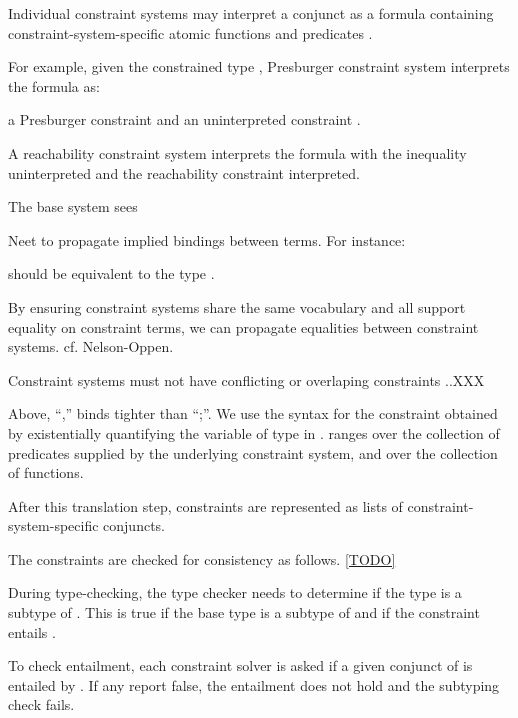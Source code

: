 Individual constraint systems may interpret a conjunct as a
formula containing constraint-system-specific atomic functions
 and predicates .  

For example, given the constrained type
,
Presburger constraint system interprets the formula as:

a Presburger constraint 
and
an uninterpreted constraint .

A reachability constraint system interprets the formula with the
inequality uninterpreted and the reachability constraint
interpreted.

The base system sees  

Neet to propagate implied bindings between terms.  For instance:

should be equivalent to the type
.

By ensuring constraint systems share the same vocabulary and all
support equality on constraint terms, we can propagate
equalities between constraint systems.
cf. Nelson-Oppen.

Constraint systems must not have conflicting or overlaping
constraints ..XXX

Above, ``,'' binds tighter than ``;''. We use the syntax  for the constraint obtained by existentially
quantifying the
variable  of type  in .  ranges over
the collection of predicates supplied by the underlying
constraint
system, and  over the collection of functions.




After this translation step, constraints are represented as
lists of constraint-system-specific conjuncts.

The constraints are checked for consistency as follows.
\ref{TODO}
\fi

During type-checking, the type checker needs to determine if the
type
 is a subtype of .  This is true if 
the base type  is a subtype of  and if the
constraint  entails .

To check entailment, each constraint solver is asked if
a given conjunct of  is entailed by .
If any report false, the entailment does not hold and the
subtyping check fails.


